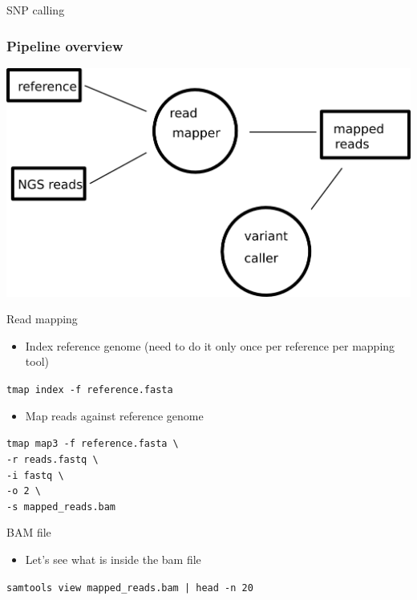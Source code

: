 \documentclass{beamer}
\newcommand{\refindex}[1]{\texttt{tmap index -f #1}}
\newcommand{\tmap}[3]{\texttt{tmap map3 -f #1 \textbackslash \\
    -r #2 \textbackslash \\
    -i fastq \textbackslash \\
    -o 2 \textbackslash \\
    -s #3
  }
}
\begin{document}
\begin{frame}{SNP calling}
  \frametitle{Pipeline overview}
  \includegraphics[width=\linewidth, keepaspectratio]{pic/pipe_overview.png}
\end{frame}

\begin{frame}{Read mapping}
  \begin{itemize}
    \item Index reference genome (need to do it only once per reference per mapping tool)
  \end{itemize}
  \refindex{reference.fasta}
  \pause
  \begin{itemize}
    \item Map reads against reference genome
  \end{itemize}
  \tmap{reference.fasta}{reads.fastq}{mapped\_reads.bam}
\end{frame}

\begin{frame}{BAM file}
  \begin{itemize}
    \item Let's see what is inside the bam file
  \end{itemize}
  \texttt{samtools view mapped\_reads.bam | head -n 20}
\end{frame}

{
\begin{frame}[plain]
\end{frame}
}
\end{document}
